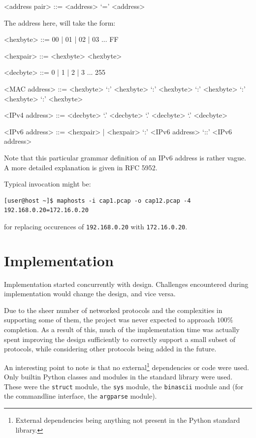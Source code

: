 \documentclass[10pt,a4paper,notitlepage]{report}
\begin{document}
\begin{grammar}
<address pair> ::= <address> `=' <address>
\end{grammar}

The address here, will take the form:

\begin{grammar}
<hexbyte> ::= 00 | 01 | 02 | 03 ... FF

<hexpair> ::= <hexbyte> <hexbyte>

<decbyte> ::= 0 | 1 | 2 | 3 ... 255

<MAC address> ::= <hexbyte> `:' <hexbyte> `:' <hexbyte> `:' <hexbyte> `:' <hexbyte> `:' <hexbyte>

<IPv4 address> ::= <decbyte> `.' <decbyte> `.' <decbyte> `.' <decbyte>

<IPv6 address> ::= <hexpair> | <hexpair> `:' <IPv6 address>
 `::' <IPv6 address>
\end{grammar}

Note that this particular grammar definition of an IPv6 address is rather vague. A more detailed explanation is given in RFC 5952\cite{rfc5952}.

Typical invocation might be:

\begin{verbatim}
[user@host ~]$ maphosts -i cap1.pcap -o cap12.pcap -4 192.168.0.20=172.16.0.20
\end{verbatim}

for replacing occurences of \texttt{192.168.0.20} with \texttt{172.16.0.20}.

\chapter{Implementation}
Implementation started concurrently with design. Challenges encountered during implementation would change the design, and vice versa.

Due to the sheer number of networked protocols and the complexities in supporting some of them, the project was never expected to approach $100\%$ completion. As a result of this, much of the implementation time was actually spent improving the design sufficiently to correctly support a small subset of protocols, while considering other protocols being added in the future.

An interesting point to note is that no external\footnote{External dependencies being anything not present in the Python standard library.} dependencies or code were used. Only builtin Python classes and modules in the standard library were used. These were the \texttt{struct} module,  the \texttt{sys} module, the \texttt{binascii} module and (for the commandline interface, the \texttt{argparse} module).
\end{document}
